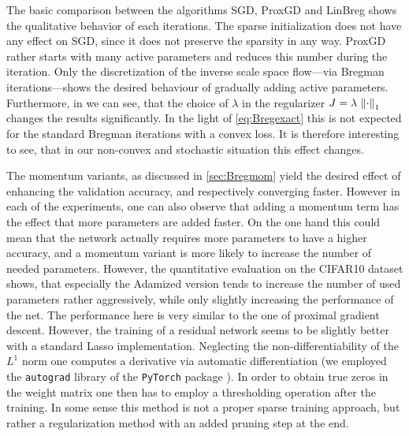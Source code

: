 The basic comparison between the  algorithms SGD, ProxGD and LinBreg shows the qualitative behavior of each iterations. The sparse initialization does not have any effect on SGD, since it does not preserve the sparsity in any way. ProxGD rather starts with many active parameters and reduces this number during the iteration. Only the discretization of the inverse scale space flow---via Bregman iterations---shows the desired behaviour of gradually adding active parameters. Furthermore, in \cite[Fig. 2]{bungert2022bregman} we can see, that the choice of $\lambda$ in the regularizer $J = \lambda\, \left\|\cdot\right\|_1$ changes the results significantly. In the light of \cref{eq:Bregexact} this is not expected for the standard Bregman iterations with a convex loss. It is therefore interesting to see, that in our non-convex and stochastic situation this effect changes.

The momentum variants, as discussed in \cref{sec:Bregmom} yield the desired effect of enhancing the validation accuracy, and respectively converging faster. However in each  of the experiments, one can also observe that adding a momentum term has the effect that more parameters are added faster. On the one hand this could mean that the network actually requires more parameters to have a higher accuracy, and a momentum variant is more likely to increase the number of needed parameters. However, the quantitative evaluation on the CIFAR10 dataset \cite{krizhevsky2009learning} shows, that especially the Adamized version tends to increase the number of used parameters rather aggressively, while only slightly increasing the performance of the net. The performance here is very similar to the one of proximal gradient descent. However, the training of a residual network seems to be slightly better with a standard Lasso implementation. Neglecting the non-differentiability of the $L^1$ norm one computes a derivative via automatic differentiation \cite{rall1981automatic, maclaurin2015autograd} (we employed the \texttt{autograd} library of the \texttt{PyTorch} package \cite{paszke2019pytorch}). In order to obtain true zeros in the weight matrix one then has to employ a thresholding operation after the training. In some sense this method is not a proper sparse training approach, but rather a regularization method with an added pruning step at the end.

